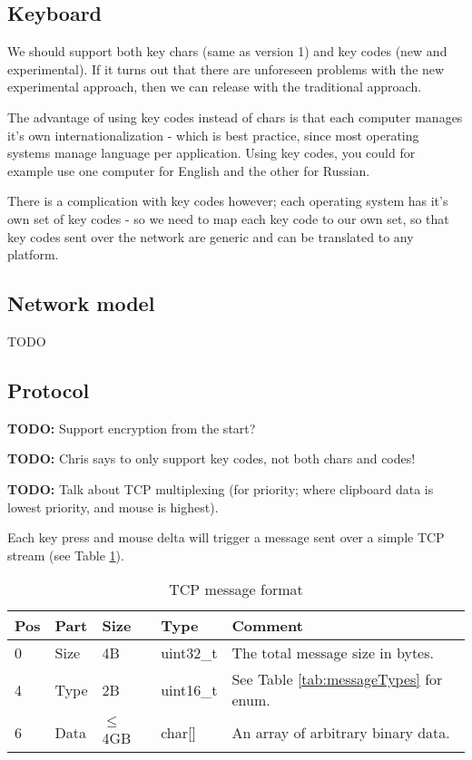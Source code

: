 \subsection{Keyboard}

We should support both key chars (same as version 1) and key codes (new and
experimental). If it turns out that there are unforeseen problems with the
new experimental approach, then we can release with the traditional approach.

The advantage of using key codes instead of chars is that each computer manages
it's own internationalization - which is best practice, since most operating
systems manage language per application. Using key codes, you could for example 
use one computer for English and the other for Russian.

There is a complication with key codes however; each operating system has it's
own set of key codes - so we need to map each key code to our own set, so that
key codes sent over the network are generic and can be translated to any 
platform.

\subsection{Network model}

TODO



\subsection{Protocol}

\textbf{TODO:} Support encryption from the start?

\textbf{TODO:} Chris says to only support key codes, not both chars and codes!

\textbf{TODO:} Talk about TCP multiplexing (for priority; where clipboard data 
is lowest priority, and mouse is highest).

Each key press and mouse delta will trigger a message sent over a simple TCP 
stream (see Table \ref{tab:messageFormat}).

\begin{table}
  \begin{tabular}{|l|l|l|l|l|}
    \hline
    \textbf{Pos} &
    \textbf{Part} &
    \textbf{Size} &
    \textbf{Type} &
    \textbf{Comment} \\
    \hline
    0 & Size & 4B & uint32\_t & The total message size in bytes. \\
    4 & Type & 2B & uint16\_t & See Table \ref{tab:messageTypes} for enum. \\
    6 & Data & $\leq$4GB & char[] & An array of arbitrary binary data. \\
    \hline
  \end{tabular}
  \caption{TCP message format}
  \label{tab:messageFormat}
\end{table}


